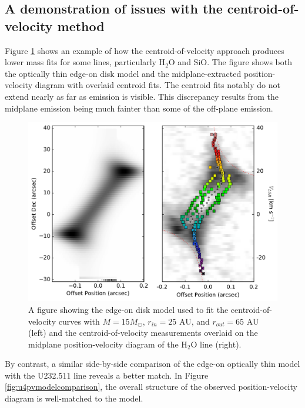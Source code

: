 \documentclass[twocolumn]{aastex61}
\newcommand{\msun}{\ensuremath{M_{\odot}}\xspace}			%
\newcommand{\water}{H$_{2}$O\xspace}		%
\begin{document}
\subsection{A demonstration of issues with the centroid-of-velocity method}
Figure \ref{fig:h2opvfailuremode} shows an example of how the
centroid-of-velocity approach produces lower mass fits for some lines,
particularly \water and SiO.  The figure shows both the optically thin edge-on
disk model and the midplane-extracted position-velocity diagram with overlaid
centroid fits.  The centroid fits notably do not extend nearly as far as
emission is visible.  This discrepancy results from the midplane emission being
much fainter than some of the off-plane emission.


\begin{figure}[!htp]
\includegraphics[scale=1,width=6in]{figures/H2Ov2=1_5(5,0)-6(4,3)_pp_pv_plots_fittedmodel_15msun_withavgs_comparepv.pdf}
\caption{A figure showing the edge-on disk model used to fit the centroid-of-velocity curves with
$M=15 \msun$, $r_{in}=25$ AU, and $r_{out}=65$ AU (left) and the centroid-of-velocity measurements
overlaid on the midplane position-velocity diagram of the \water line (right).}
\label{fig:h2opvfailuremode}
\end{figure}


By contrast, a similar side-by-side comparison of the edge-on optically thin
model with the U232.511 line reveals a better match.  In Figure
\ref{fig:u4pvmodelcomparison}, the overall structure of the observed
position-velocity diagram is well-matched to the model.

\end{document}
